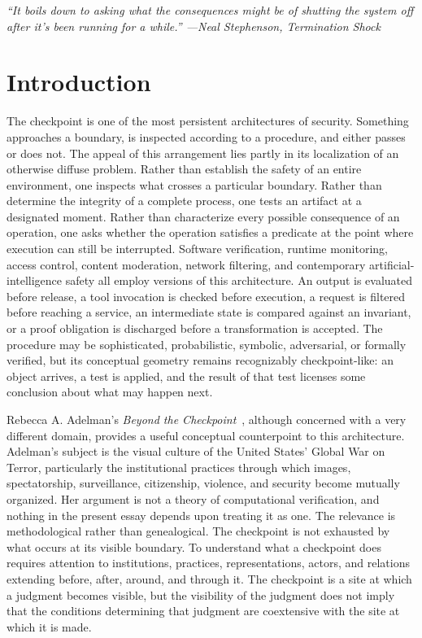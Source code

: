 \documentclass[11pt]{article}
\begin{document}
\newpage

\begin{flushright} \begin{minipage}{0.72\textwidth} \itshape ``It boils down to asking what the consequences might be of shutting the system off after it's been running for a while.''
\raggedleft ---Neal Stephenson, \emph{Termination Shock} \end{minipage} \end{flushright}
\vspace{1.5em}

\section{Introduction}

The checkpoint is one of the most persistent architectures of security. Something approaches a boundary, is inspected according to a procedure, and either passes or does not. The appeal of this arrangement lies partly in its localization of an otherwise diffuse problem. Rather than establish the safety of an entire environment, one inspects what crosses a particular boundary. Rather than determine the integrity of a complete process, one tests an artifact at a designated moment. Rather than characterize every possible consequence of an operation, one asks whether the operation satisfies a predicate at the point where execution can still be interrupted. Software verification, runtime monitoring, access control, content moderation, network filtering, and contemporary artificial-intelligence safety all employ versions of this architecture. An output is evaluated before release, a tool invocation is checked before execution, a request is filtered before reaching a service, an intermediate state is compared against an invariant, or a proof obligation is discharged before a transformation is accepted. The procedure may be sophisticated, probabilistic, symbolic, adversarial, or formally verified, but its conceptual geometry remains recognizably checkpoint-like: an object arrives, a test is applied, and the result of that test licenses some conclusion about what may happen next.

Rebecca A. Adelman's \textit{Beyond the Checkpoint}~\cite{adelman2014}, although concerned with a very different domain, provides a useful conceptual counterpoint to this architecture. Adelman's subject is the visual culture of the United States' Global War on Terror, particularly the institutional practices through which images, spectatorship, surveillance, citizenship, violence, and security become mutually organized. Her argument is not a theory of computational verification, and nothing in the present essay depends upon treating it as one. The relevance is methodological rather than genealogical. The checkpoint is not exhausted by what occurs at its visible boundary. To understand what a checkpoint does requires attention to institutions, practices, representations, actors, and relations extending before, after, around, and through it. The checkpoint is a site at which a judgment becomes visible, but the visibility of the judgment does not imply that the conditions determining that judgment are coextensive with the site at which it is made.
\end{document}
